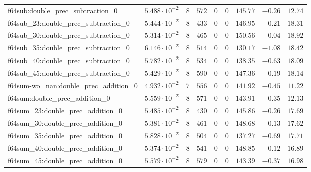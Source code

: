 \begin{tabular}{|l|c|c|c|c|c|c|c|c|}
f64sub:double\_prec\_subtraction\_0            & $ 5.488 \cdot 10^{-2} $ & $ 8      $ & $ 572    $ & $ 0   $ & $ 0      $ & $ 145.77      $ & $ -0.26   $ & $ 12.74   $ \\
f64sub\_23:double\_prec\_subtraction\_0        & $ 5.444 \cdot 10^{-2} $ & $ 8      $ & $ 433    $ & $ 0   $ & $ 0      $ & $ 146.95      $ & $ -0.21   $ & $ 18.31   $ \\
f64sub\_30:double\_prec\_subtraction\_0        & $ 5.314 \cdot 10^{-2} $ & $ 8      $ & $ 465    $ & $ 0   $ & $ 0      $ & $ 150.56      $ & $ -0.04   $ & $ 18.92   $ \\
f64sub\_35:double\_prec\_subtraction\_0        & $ 6.146 \cdot 10^{-2} $ & $ 8      $ & $ 514    $ & $ 0   $ & $ 0      $ & $ 130.17      $ & $ -1.08   $ & $ 18.42   $ \\
f64sub\_40:double\_prec\_subtraction\_0        & $ 5.782 \cdot 10^{-2} $ & $ 8      $ & $ 534    $ & $ 0   $ & $ 0      $ & $ 138.35      $ & $ -0.63   $ & $ 18.09   $ \\
f64sub\_45:double\_prec\_subtraction\_0        & $ 5.429 \cdot 10^{-2} $ & $ 8      $ & $ 590    $ & $ 0   $ & $ 0      $ & $ 147.36      $ & $ -0.19   $ & $ 18.14   $ \\
f64sum-wo\_nan:double\_prec\_addition\_0       & $ 4.932 \cdot 10^{-2} $ & $ 7      $ & $ 556    $ & $ 0   $ & $ 0      $ & $ 141.92      $ & $ -0.45   $ & $ 11.22   $ \\
f64sum:double\_prec\_addition\_0               & $ 5.559 \cdot 10^{-2} $ & $ 8      $ & $ 571    $ & $ 0   $ & $ 0      $ & $ 143.91      $ & $ -0.35   $ & $ 12.13   $ \\
f64sum\_23:double\_prec\_addition\_0           & $ 5.485 \cdot 10^{-2} $ & $ 8      $ & $ 430    $ & $ 0   $ & $ 0      $ & $ 145.86      $ & $ -0.26   $ & $ 17.69   $ \\
f64sum\_30:double\_prec\_addition\_0           & $ 5.381 \cdot 10^{-2} $ & $ 8      $ & $ 461    $ & $ 0   $ & $ 0      $ & $ 148.68      $ & $ -0.13   $ & $ 17.62   $ \\
f64sum\_35:double\_prec\_addition\_0           & $ 5.828 \cdot 10^{-2} $ & $ 8      $ & $ 504    $ & $ 0   $ & $ 0      $ & $ 137.27      $ & $ -0.69   $ & $ 17.71   $ \\
f64sum\_40:double\_prec\_addition\_0           & $ 5.374 \cdot 10^{-2} $ & $ 8      $ & $ 541    $ & $ 0   $ & $ 0      $ & $ 148.85      $ & $ -0.12   $ & $ 16.89   $ \\
f64sum\_45:double\_prec\_addition\_0           & $ 5.579 \cdot 10^{-2} $ & $ 8      $ & $ 579    $ & $ 0   $ & $ 0      $ & $ 143.39      $ & $ -0.37   $ & $ 16.98   $ \\

\end{tabular}
